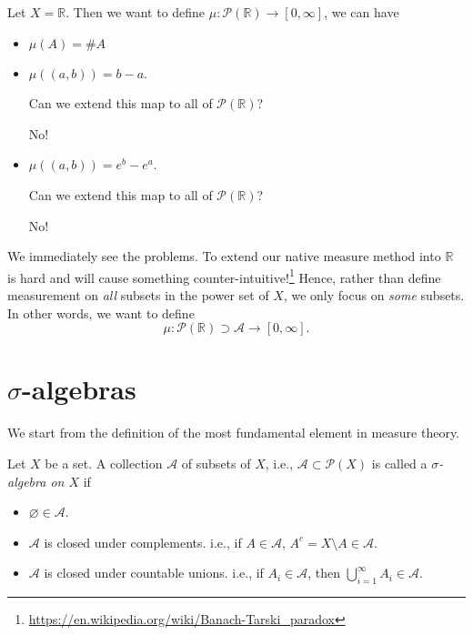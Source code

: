 \begin{eg}
	Let \(X = \mathbb{R} \). Then we want to define \(\mu\colon \mathcal{P}(\mathbb{R} )\to \left[0, \infty\right] \), we can have
	\begin{itemize}
		\item \(\mu(A) = \# A\)
		\item \(\mu(\left(a, b\right)) = b-a\).
		      \begin{problem}
		      Can we extend this map to all of \(\mathcal{P}(\mathbb{R} )\)?
		      \end{problem}
		      \begin{answer}
			      No!
		      \end{answer}
		\item \(\mu(\left(a, b\right)) = e^b - e^a\).
		      \begin{problem}
		      Can we extend this map to all of \(\mathcal{P}(\mathbb{R} )\)?
		      \end{problem}
		      \begin{answer}
			      No!
		      \end{answer}
	\end{itemize}
\end{eg}

We immediately see the problems. To extend our native measure method into \(\mathbb{R} \) is hard and will cause something counter-intuitive!\footnote{\url{https://en.wikipedia.org/wiki/Banach-Tarski_paradox}}
Hence, rather than define measurement on \emph{all} subsets in the power set of \(X\), we only focus on \emph{some} subsets. In other words, we
want to define
\[
	\mu\colon \mathcal{P}(\mathbb{R} )\supset\mathcal{A} \to \left[0, \infty\right].
\]

\section{\(\sigma\)-algebras}
We start from the definition of the most fundamental element in measure theory.
\begin{definition}\label{def:sigma-algebra}
	Let \(X\) be a set. A collection \(\mathcal{A} \) of subsets of \(X\), i.e., \(\mathcal{A}\subset \mathcal{P} (X) \) is called a \emph{\(\sigma\)-algebra on \(X\)} if
	\begin{itemize}
		\item \(\varnothing \in \mathcal{A} \).
		\item \(\mathcal{A} \) is closed under complements. i.e., if \(A\in \mathcal{A} \), \(A^c = X\setminus A\in \mathcal{A} \).
		\item \(\mathcal{A} \) is closed under countable unions. i.e., if \(A_i\in \mathcal{A} \), then \(\bigcup\limits_{i=1}^{\infty} A_{i}\in \mathcal{A} \).
	\end{itemize}
\end{definition}

